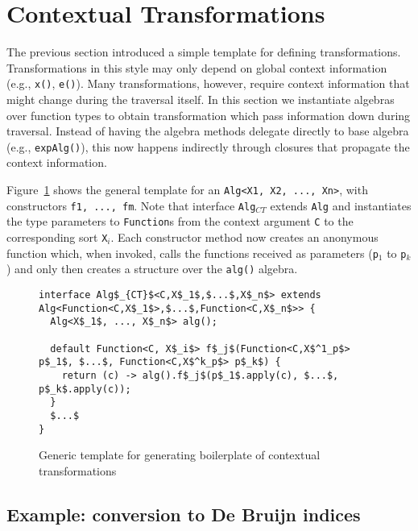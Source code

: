 \section{Contextual Transformations}\label{sec:contexttrans}

The previous section introduced a simple template for defining transformations.
Transformations in this style may only depend on global context information (e.g., \lstinline{x()}, \lstinline{e()}).
Many transformations, however, require context information that might change during the traversal itself.
In this section we instantiate algebras over function types to obtain transformation which pass information down during traversal.
Instead of having the algebra methods delegate directly to base algebra (e.g., \lstinline{expAlg()}), this now happens indirectly through closures that propagate the context information.

Figure~\ref{ctxTrafoTemplate} shows the general template for an \lstinline{Alg<X1, X2, ..., Xn>}, with constructors \lstinline{f1, ..., fm}.
Note that interface \lstinline{Alg}$_{CT}$ extends \lstinline{Alg} and instantiates the type parameters to \lstinline{Function}s from the context argument \lstinline{C} to the corresponding sort \lstinline{X}$_i$.
Each constructor method now creates an anonymous function which, when invoked, calls the functions received as parameters (\lstinline{p}$_1$ to \lstinline{p}$_k$) and only then creates a structure over the \lstinline{alg()} algebra.

\begin{figure}[t]
\begin{lstlisting}[mathescape=true]
interface Alg$_{CT}$<C,X$_1$,$...$,X$_n$> extends Alg<Function<C,X$_1$>,$...$,Function<C,X$_n$>> {
  Alg<X$_1$, ..., X$_n$> alg();

  default Function<C, X$_i$> f$_j$(Function<C,X$^1_p$> p$_1$, $...$, Function<C,X$^k_p$> p$_k$) {
    return (c) -> alg().f$_j$(p$_1$.apply(c), $...$, p$_k$.apply(c));
  }
  $...$
}
\end{lstlisting}
\caption{Generic template for generating boilerplate of contextual transformations}
\label{ctxTrafoTemplate}
\end{figure}

\subsection{Example: conversion to De Bruijn indices}

